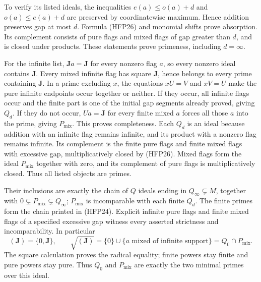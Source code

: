 To verify its listed ideals, the inequalities
$e(a)\le o(a)+d$ and $o(a)\le e(a)+d$ are preserved by
coordinatewise maximum. Hence addition preserves gap
at most $d$. Formula (HFP26) and monomial shifts prove
absorption. Its complement consists of pure flags and
mixed flags of gap greater than $d$, and is closed under
products. These statements prove primeness, including
$d=\infty$.

For the infinite list, $\mathbf Ja=\mathbf J$ for every
nonzero flag $a$, so every nonzero ideal contains
$\mathbf J$. Every mixed infinite flag has square
$\mathbf J$, hence belongs to every prime containing
$\mathbf J$. In a prime excluding $x$, the equations
$xU=V$ and $xV=U$ make the pure infinite endpoints occur
together or neither. If they occur, all infinite flags
occur and the finite part is one of the initial gap
segments already proved, giving $Q_d$. If they do not
occur, $Ua=\mathbf J$ for every finite mixed $a$ forces
all those $a$ into the prime, giving $P_{\mathrm{mix}}$.
This proves completeness. Each $Q_d$ is an ideal because
addition with an infinite flag remains infinite, and
its product with a nonzero flag remains infinite. Its
complement is the finite pure flags and finite mixed
flags with excessive gap, multiplicatively closed by
(HFP26). Mixed flags form the ideal $P_{\mathrm{mix}}$
together with zero, and its complement of pure flags
is multiplicatively closed. Thus all listed objects
are primes.

Their inclusions are exactly the chain of $Q$ ideals
ending in $Q_\infty\subsetneq M$, together with
$0\subsetneq P_{\mathrm{mix}}\subsetneq Q_\infty$;
$P_{\mathrm{mix}}$ is incomparable with each finite
$Q_d$. The finite primes form the chain printed in
(HFP24). Explicit infinite pure flags and finite mixed
flags of a specified excessive gap witness every asserted
strictness and incomparability. In particular
\begin{equation}\tag{HFP27}
 (\mathbf J)=\{0,\mathbf J\},\qquad
 \sqrt{(\mathbf J)}
  =\{0\}\cup\{a\text{ mixed of infinite support}\}
  =Q_0\cap P_{\mathrm{mix}}.
\end{equation}
The square calculation proves the radical equality;
finite powers stay finite and pure powers stay pure.
Thus $Q_0$ and $P_{\mathrm{mix}}$ are exactly the two
minimal primes over this ideal.


